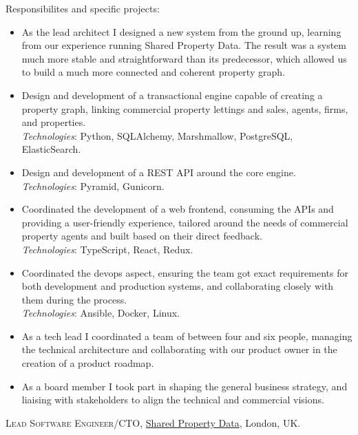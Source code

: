 \documentclass[11pt]{article}
\newcommand{\years}[1]{\marginnote{\scriptsize #1}}
\begin{document}
Responsibilites and specific projects:
\begin{itemize}
	\item  As the lead architect I designed a new system from the ground up, learning from our experience running Shared Property Data. The result was a system much more stable and straightforward than its predecessor, which allowed us to build a much more connected and coherent property graph.
	\item  Design and development of a transactional engine capable of creating a property graph, linking commercial property lettings and sales, agents, firms, and properties.\\
	\textit{Technologies}: Python, SQLAlchemy, Marshmallow, PostgreSQL, ElasticSearch.
	\item  Design and development of a REST API around the core engine.\\
	\textit{Technologies}: Pyramid, Gunicorn.
	\item  Coordinated the development of a web frontend, consuming the APIs and providing a user-friendly experience, tailored around the needs of commercial property agents and built based on their direct feedback.\\
	\textit{Technologies}: TypeScript, React, Redux.
	\item  Coordinated the devops aspect, ensuring the team got exact requirements for both development and production systems, and collaborating closely with them during the process.\\
	\textit{Technologies}: Ansible, Docker, Linux.
	\item  As a tech lead I coordinated a team of between four and six people, managing the technical architecture and collaborating with our product owner in the creation of a product roadmap.
	\item  As a board member I took part in shaping the general business strategy, and liaising with stakeholders to align the technical and commercial visions.
\end{itemize}

\years{2014--2017}\textsc{Lead Software Engineer/CTO}, \href{http://myspd.co.uk}{Shared Property Data}, London, UK.
\end{document}
